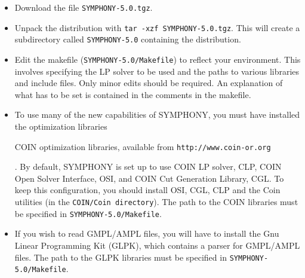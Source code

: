\begin{itemize}

        \item Download the file {\tt SYMPHONY-5.0.tgz}.

        \item Unpack the distribution with {\tt tar -xzf
        SYMPHONY-5.0.tgz}. This will create a subdirectory called
        {\tt SYMPHONY-5.0} containing the distribution.
        
        \item Edit the makefile ({\tt SYMPHONY-5.0/Makefile}) to reflect your
              environment. This involves specifying the LP solver to be used
              and the paths to various libraries and include files. Only minor
              edits should be required. An explanation of what has to be set
              is contained in the comments in the makefile. 

        \item To use many of the new capabilities of SYMPHONY, you must have
	      installed the
	      optimization libraries \begin{latexonly} COIN optimization
	      libraries, available from \texttt{http://www.coin-or.org}
	      \end{latexonly}.  By default, SYMPHONY is 
	      set up to use COIN LP solver, CLP, COIN Open Solver Interface, 
	      OSI, and COIN Cut Generation Library, CGL. To keep this 
	      configuration, you should install OSI, CGL, CLP and the Coin 
	      utilities (in the \texttt{COIN/Coin directory}). The path to 
	      the COIN libraries must be specified in 
	      \texttt{SYMPHONY-5.0/Makefile}.

        \item If you wish to read GMPL/AMPL files, you will have to install
	      the Gnu Linear Programming Kit (GLPK), which contains a parser
	      for GMPL/AMPL files. The path to the GLPK libraries must be
	      specified in \texttt{SYMPHONY-5.0/Makefile}.



\end{itemize}
